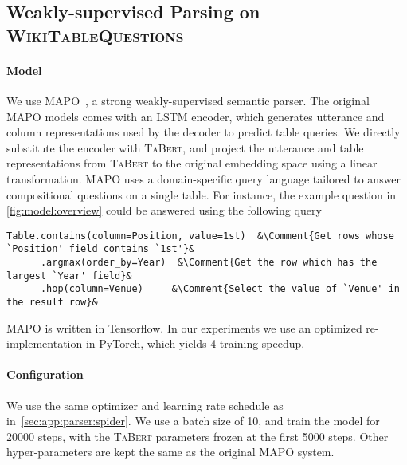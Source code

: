 \documentclass[11pt,a4paper]{article}
\def\model/{\textsc{TaBert}}
\def\wtq/{\textsc{WikiTableQuestions}}
\begin{document}
\subsection{Weakly-supervised Parsing on \wtq/}
\label{sec:app:parser:wtq}

\paragraph{Model} We use MAPO~\cite{liang18mapo}, a strong weakly-supervised semantic parser.
The original MAPO models comes with an LSTM encoder, which generates utterance and column representations used by the decoder to predict table queries.
We directly substitute the encoder with \model/, and project the utterance and table representations from \model/ to the original embedding space using a linear transformation.
MAPO uses a domain-specific query language tailored to answer compositional questions on a single table.
For instance, the example question in \autoref{fig:model:overview} could be answered using the following query
\begin{lstlisting}
Table.contains(column=Position, value=1st)  &\Comment{Get rows whose `Position' field contains `1st'}&  
      .argmax(order_by=Year)  &\Comment{Get the row which has the largest `Year' field}&
      .hop(column=Venue)     &\Comment{Select the value of `Venue' in the result row}&
\end{lstlisting}
MAPO is written in Tensorflow. In our experiments we use an optimized re-implementation in PyTorch, which yields 4 training speedup.

\paragraph{Configuration} We use the same optimizer and learning rate schedule as in~\autoref{sec:app:parser:spider}. We use a batch size of 10, and train the model for 20000 steps, with the \model/ parameters frozen at the first 5000 steps. Other hyper-parameters are kept the same as the original MAPO system.
\end{document}
